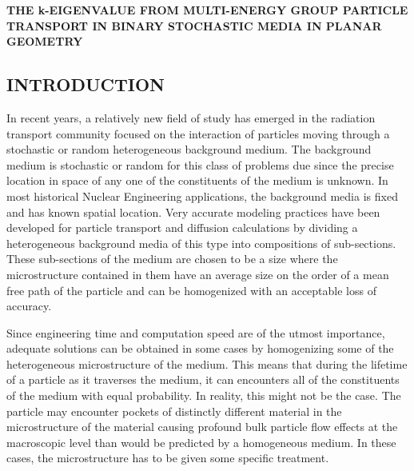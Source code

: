 
\ResetSingleSpace

\begin{center}
{\textbf{
THE k-EIGENVALUE FROM MULTI-ENERGY GROUP PARTICLE TRANSPORT
IN BINARY STOCHASTIC MEDIA IN PLANAR GEOMETRY
}}
\end{center}

\ResetDoubleSpace

\vskip0.25in

\begin{center}
\section{INTRODUCTION}
\label{sec:Intro}
\end{center}

\setcounter{page}{1}
\thispagestyle{empty}

\vskip-0.1in

\noindent
	\indent In recent years, a relatively new field of study has emerged in the radiation 
	transport community focused on the interaction of particles moving through a stochastic
	or random heterogeneous background medium.  The background medium is stochastic
	or random for this class of problems due since the precise location in space of any one
	of the constituents of the medium is unknown.  In most historical Nuclear Engineering
	applications, the background media is fixed and has known spatial location.  
	Very accurate modeling practices have been developed for particle transport
	and diffusion calculations by dividing a heterogeneous background media of this
	type into compositions of sub-sections.  These sub-sections of the medium are chosen
	to be a size where the microstructure contained in them have an average size on the 
	order of a mean free path of the particle and can be homogenized with an acceptable
	loss of accuracy.
		
\noindent
	\indent Since engineering time and computation speed are of the utmost importance, 
	adequate solutions can be obtained in some cases by homogenizing some of the 
	heterogeneous microstructure of the medium.  This means that during the lifetime of a
	particle as it traverses the medium, it can encounters all of the constituents 
	of the medium with equal probability.  In reality, this might not be the case.  The particle
	may encounter 	pockets of distinctly different material in the microstructure of the material
	causing profound bulk particle flow effects at the macroscopic level than would be
	predicted by a homogeneous medium.  In these cases, the microstructure has to be given
	some specific treatment.
	
